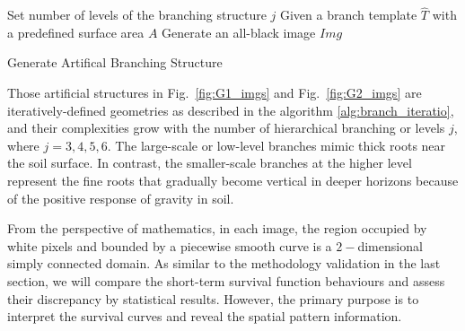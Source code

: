   \begin{algorithm}
    \SetAlgoLined

      Set number of levels of the branching structure $j$\;
      Given a branch template $\widehat{T}$ with a predefined surface area $A$\;
      Generate an all-black image $Img$\;
      
      
    
      \caption{Generate Artifical Branching Structure}
      \label{alg:branch_iteration}
  \end{algorithm}


Those artificial structures in Fig.~\ref{fig:G1_imgs} and
Fig.~\ref{fig:G2_imgs} are iteratively-defined geometries as described
in the algorithm \ref{alg:branch_iteratio}, and their complexities
grow with the number of hierarchical branching or levels $j$, where
$j=3, 4, 5, 6$. The large-scale or low-level branches mimic thick
roots near the soil surface. In contrast, the smaller-scale branches
at the higher level represent the fine roots that gradually become
vertical in deeper horizons because of the positive response of
gravity in soil.


From the perspective of mathematics, in each image, the region
occupied by white pixels and bounded by a piecewise smooth curve is a
$2-$dimensional simply connected domain. As similar to the methodology
validation in the last section, we will compare the short-term
survival function behaviours and assess their discrepancy by
statistical results. However, the primary purpose is to interpret the
survival curves and reveal the spatial pattern information.









      

      
    







